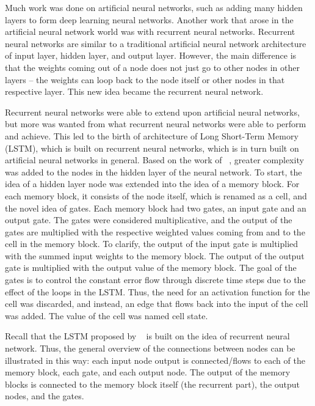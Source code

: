 \documentclass[11pt,letterpaper]{article}
\begin{document}
Much work was done on artificial neural networks, such as adding many hidden layers to form deep learning neural networks. Another work that arose in the artificial neural network world was with recurrent neural networks. Recurrent neural networks are similar to a traditional artificial neural network architecture of input layer, hidden layer, and output layer. However, the main difference is that the weights coming out of a node does not just go to other nodes in other layers -- the weights can loop back to the node itself or other nodes in that respective layer. This new idea became the recurrent neural network.

Recurrent neural networks were able to extend upon artificial neural networks, but more was wanted from what recurrent neural networks were able to perform and achieve. This led to the birth of architecture of Long Short-Term Memory (LSTM), which is built on recurrent neural networks, which is in turn built on artificial neural networks in general. Based on the work of ~\cite{Hochreiter:97}, greater complexity was added to the nodes in the hidden layer of the neural network. To start, the idea of a hidden layer node was extended into the idea of a memory block. For each memory block, it consists of the node itself, which is renamed as a cell, and the novel idea of gates. Each memory block had two gates, an input gate and an output gate. The gates were considered multiplicative, and the output of the gates are multiplied with the respective weighted values coming from and to the cell in the memory block. To clarify, the output of the input gate is multiplied with the summed input weights to the memory block. The output of the output gate is multiplied with the output value of the memory block. The goal of the gates is to control the constant error flow through discrete time steps due to the effect of the loops in the LSTM. Thus, the need for an activation function for the cell was discarded, and instead, an edge that flows back into the input of the cell was added. The value of the cell was named cell state.

Recall that the LSTM proposed by ~\cite{Hochreiter:97} is built on the idea of recurrent neural network. Thus, the general overview of the connections between nodes can be illustrated in this way: each input node output is connected/flows to each of the memory block, each gate, and each output node. The output of the memory blocks is connected to the memory block itself (the recurrent part), the output nodes, and the gates.
\end{document}
